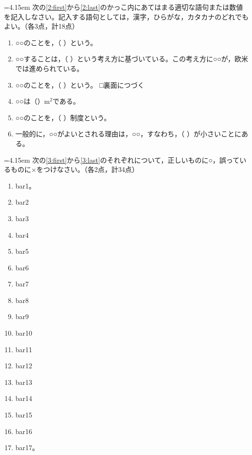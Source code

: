 \documentclass[10pt,a4j,uplatex]{jsarticle}
\newenvironment{question}[1]{%
	\noindent\hangindent=4.15em\hangafter=1{\setlength{\fboxrule}{.4pt}\fbox{\mgfamily\textbf{問題 #1}}}\hspace{.5zw}}%
	{\vspace{.1\baselineskip}}
\begin{document}
\vfill

\begin{question}{２}
次の{\ref{2:first}}から{\ref{2:last}}のかっこ内にあてはまる適切な語句または数値を記入しなさい。記入する語句としては，漢字，ひらがな，カタカナのどれでもよい。（各3点，計18点）

\begin{enumerate}
	\item ○○のことを，（\vbox{\hsize=60pt \phantom{}}）という。\label{2:first}
	\item ○○することは，（\vbox{\hsize=60pt \phantom{}}）という考え方に基づいている。この考え方に○○が，欧米では進められている。
	\item ○○のことを，（\vbox{\hsize=60pt \phantom{}}）という。
\vfill
\hfill □\llap{\ajCheckmark}裏面につづく
\newpage
	\item ○○は（\qquad\qquad\qquad ）$\textrm{m}^2$である。
	\item ○○のことを，（\vbox{\hsize=60pt \phantom{}}）制度という。
	\item 一般的に，○○がよいとされる理由は，○○，すなわち，（\vbox{\hsize=60pt \phantom{}}）が小さいことにある。\label{2:last}
\end{enumerate}
\end{question}


\vspace{2\baselineskip}
\begin{question}{３}
次の{\ref{3:first}}から{\ref{3:last}}のそれぞれについて，正しいものに○，誤っているものに×をつけなさい。（各2点，計34点）

\begin{enumerate}
	\item bar1。\label{3:first}
	\item bar2
	\item bar3
	\item bar4
	\item bar5
\vspace{.5\baselineskip}
	\item bar6
	\item bar7
	\item bar8
	\item bar9
	\item bar10
\vspace{.5\baselineskip}
	\item bar11
	\item bar12
	\item bar13
	\item bar14
	\item bar15
\vspace{.5\baselineskip}
	\item bar16
	\item bar17。\label{3:last}
\end{enumerate}
\end{question}
\end{document}

